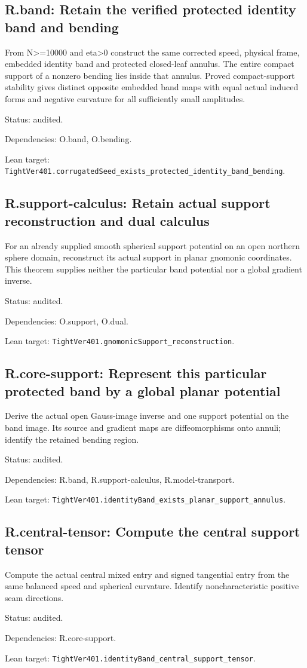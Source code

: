 \documentclass{article}
\begin{document}
\subsection*{R.band: Retain the verified protected identity band and bending}
From N>=10000 and eta>0 construct the same corrected speed, physical frame, embedded identity band and protected closed-leaf annulus. The entire compact support of a nonzero bending lies inside that annulus. Proved compact-support stability gives distinct opposite embedded band maps with equal actual induced forms and negative curvature for all sufficiently small amplitudes.
\par Status: audited.
\par Dependencies: O.band, O.bending.
\par Lean target: \texttt{TightVer401.corrugatedSeed\_exists\_protected\_identity\_band\_bending}.
\subsection*{R.support-calculus: Retain actual support reconstruction and dual calculus}
For an already supplied smooth spherical support potential on an open northern sphere domain, reconstruct its actual support in planar gnomonic coordinates. This theorem supplies neither the particular band potential nor a global gradient inverse.
\par Status: audited.
\par Dependencies: O.support, O.dual.
\par Lean target: \texttt{TightVer401.gnomonicSupport\_reconstruction}.
\subsection*{R.core-support: Represent this particular protected band by a global planar potential}
Derive the actual open Gauss-image inverse and one support potential on the band image. Its source and gradient maps are diffeomorphisms onto annuli; identify the retained bending region.
\par Status: audited.
\par Dependencies: R.band, R.support-calculus, R.model-transport.
\par Lean target: \texttt{TightVer401.identityBand\_exists\_planar\_support\_annulus}.
\subsection*{R.central-tensor: Compute the central support tensor}
Compute the actual central mixed entry and signed tangential entry from the same balanced speed and spherical curvature. Identify noncharacteristic positive seam directions.
\par Status: audited.
\par Dependencies: R.core-support.
\par Lean target: \texttt{TightVer401.identityBand\_central\_support\_tensor}.
\end{document}
